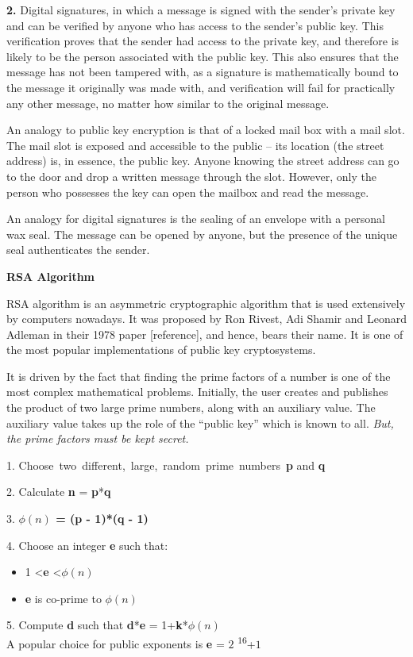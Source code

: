 \documentclass[12 pt]{article}
\begin{document}
\textbf{2. }Digital signatures, in which a message is signed with the sender's private key and can be verified by anyone who has access to the sender's public key. This verification proves that the sender had access to the private key, and therefore is likely to be the person associated with the public key. This also ensures that the message has not been tampered with, as a signature is mathematically bound to the message it originally was made with, and verification will fail for practically any other message, no matter how similar to the original message.

An analogy to public key encryption is that of a locked mail box with a mail slot. The mail slot is exposed and accessible to the public – its location (the street address) is, in essence, the public key. Anyone knowing the street address can go to the door and drop a written message through the slot. However, only the person who possesses the key can open the mailbox and read the message.

An analogy for digital signatures is the sealing of an envelope with a personal wax seal. The message can be opened by anyone, but the presence of the unique seal authenticates the sender.

\pagebreak

\begin{LARGE}
\noindent \textbf{{RSA Algorithm}}
\end{LARGE}\bigskip

\noindent RSA algorithm is an asymmetric cryptographic algorithm that is used extensively by computers nowadays. It was proposed by Ron Rivest, Adi Shamir and Leonard Adleman in their 1978 paper [reference], and hence, bears their name. It is one of the most popular implementations of public key cryptosystems.\bigskip

\noindent It is driven by the fact that finding the prime factors of a number is one of the most complex mathematical problems. Initially, the user creates and publishes the product of two large prime numbers, along with an auxiliary value. The auxiliary value takes up the role of the ``public key'' which is known to all. \emph{But, the prime factors must be kept secret.}\bigskip

1. Choose\ two\ different,\ large,\ random\  prime\  numbers\ \textbf{p} and \textbf{q}

2. Calculate \textbf{n} = \textbf{p}*\textbf{q}

3. \textbf{\boldmath $\phi(n)$ = (p - 1)*(q - 1)}

4. Choose an integer \textbf{e} such that:

\begin{itemize} \setlength\itemsep{1 em}
 \item  1 \textless \textbf{e} \textless \boldmath$\phi(n)$
 \item \textbf{e} is co-prime to \boldmath$\phi(n)$
\end{itemize}

5. Compute \textbf{d} such that \boldmath \textbf{d}*\textbf{e} = 1+\textbf{k}*\boldmath $\phi(n)$
\bigskip
\\
A popular choice for public exponents is \textbf{e} = $2$ \textsuperscript{$16$}+$1$
\end{document}
